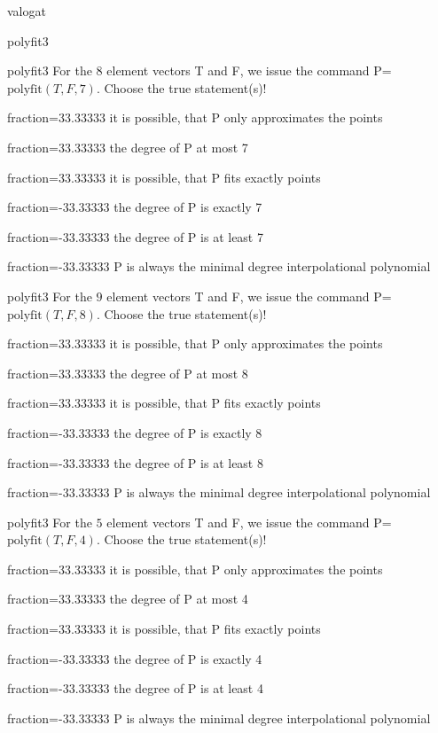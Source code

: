 \documentclass[12pt]{article}
\begin{document}
\begin{quiz}{valogat}
\begin{multi}[single=false]{polyfit3}
\end{multi}
\begin{multi}[single=false]{polyfit3}
For the $8$ element vectors T and F, we issue the command P=$\mathrm{polyfit}(T,F,7)$.
Choose the true statement(s)!
\item[fraction=33.33333] it is possible, that P only approximates the points
\item[fraction=33.33333] the degree of P at most 7
\item[fraction=33.33333] it is possible, that P fits exactly points
\item[fraction=-33.33333]  the degree of P is exactly 7
\item[fraction=-33.33333]  the degree of P is at least 7
\item[fraction=-33.33333]  P is always the minimal degree interpolational polynomial
\end{multi}
\begin{multi}[single=false]{polyfit3}
For the $9$ element vectors T and F, we issue the command P=$\mathrm{polyfit}(T,F,8)$.
Choose the true statement(s)!
\item[fraction=33.33333] it is possible, that P only approximates the points
\item[fraction=33.33333] the degree of P at most 8
\item[fraction=33.33333] it is possible, that P fits exactly points
\item[fraction=-33.33333]  the degree of P is exactly 8
\item[fraction=-33.33333]  the degree of P is at least 8
\item[fraction=-33.33333]  P is always the minimal degree interpolational polynomial
\end{multi}
\begin{multi}[single=false]{polyfit3}
For the $5$ element vectors T and F, we issue the command P=$\mathrm{polyfit}(T,F,4)$.
Choose the true statement(s)!
\item[fraction=33.33333] it is possible, that P only approximates the points
\item[fraction=33.33333] the degree of P at most 4
\item[fraction=33.33333] it is possible, that P fits exactly points
\item[fraction=-33.33333]  the degree of P is exactly 4
\item[fraction=-33.33333]  the degree of P is at least 4
\item[fraction=-33.33333]  P is always the minimal degree interpolational polynomial

\end{multi}
\end{quiz}
\end{document}
